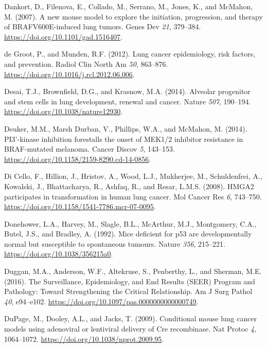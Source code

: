 \begin{CSLReferences}{0}{0}
\leavevmode{}%
Dankort, D., Filenova, E., Collado, M., Serrano, M., Jones, K., and McMahon, M. (2007). A new mouse model to explore the initiation, progression, and therapy of BRAFV600E-induced lung tumors. Genes Dev \emph{21}, 379--384. \url{https://doi.org/10.1101/gad.1516407}.

\leavevmode{}%
de Groot, P., and Munden, R.F. (2012). Lung cancer epidemiology, risk factors, and prevention. Radiol Clin North Am \emph{50}, 863--876. \url{https://doi.org/10.1016/j.rcl.2012.06.006}.

\leavevmode{}%
Desai, T.J., Brownfield, D.G., and Krasnow, M.A. (2014). Alveolar progenitor and stem cells in lung development, renewal and cancer. Nature \emph{507}, 190--194. \url{https://doi.org/10.1038/nature12930}.

\leavevmode{}%
Deuker, M.M., Marsh Durban, V., Phillips, W.A., and McMahon, M. (2014). PI3'-kinase inhibition forestalls the onset of MEK1/2 inhibitor resistance in BRAF-mutated melanoma. Cancer Discov \emph{5}, 143--153. \url{https://doi.org/10.1158/2159-8290.cd-14-0856}.

\leavevmode{}%
Di Cello, F., Hillion, J., Hristov, A., Wood, L.J., Mukherjee, M., Schuldenfrei, A., Kowalski, J., Bhattacharya, R., Ashfaq, R., and Resar, L.M.S. (2008). HMGA2 participates in transformation in human lung cancer. Mol Cancer Res \emph{6}, 743--750. \url{https://doi.org/10.1158/1541-7786.mcr-07-0095}.

\leavevmode{}%
Donehower, L.A., Harvey, M., Slagle, B.L., McArthur, M.J., Montgomery, C.A., Butel, J.S., and Bradley, A. (1992). Mice deficient for p53 are developmentally normal but susceptible to spontaneous tumours. Nature \emph{356}, 215--221. \url{https://doi.org/10.1038/356215a0}.

\leavevmode{}%
Duggan, M.A., Anderson, W.F., Altekruse, S., Penberthy, L., and Sherman, M.E. (2016). The Surveillance, Epidemiology, and End Results (SEER) Program and Pathology: Toward Strengthening the Critical Relationship. Am J Surg Pathol \emph{40}, e94--e102. \url{https://doi.org/10.1097/pas.0000000000000749}.

\leavevmode{}%
DuPage, M., Dooley, A.L., and Jacks, T. (2009). Conditional mouse lung cancer models using adenoviral or lentiviral delivery of Cre recombinase. Nat Protoc \emph{4}, 1064--1072. \url{https://doi.org/10.1038/nprot.2009.95}.


\end{CSLReferences}
